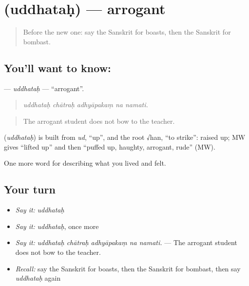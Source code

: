 \section[\texorpdfstring{\sk{उद्धतः} (uddhataḥ)}{उद्धतः (uddhataḥ)}]{ (uddhataḥ) — arrogant}

\label{lesson:SA-C458-uddhatah}



\begin{quote}
Before the new one: say the Sanskrit for boasts, then the Sanskrit for bombast.
\end{quote}

\subsection*{You'll want to know: }
\textbf{} — \emph{uddhataḥ} — \textquotedblleft{}arrogant\textquotedblright{}.

\begin{quote}
    
\end{quote}

\begin{quote}
\emph{uddhataḥ chātraḥ adhyāpakaṃ na namati.}
\end{quote}

\begin{quote}
The arrogant student does not bow to the teacher.
\end{quote}

\begin{cousinweb}
\textbf{} (\emph{uddhataḥ}) is built from \emph{ud}, \textquotedblleft{}up\textquotedblright{}, and the root √han, \textquotedblleft{}to strike\textquotedblright{}: raised up; MW gives \textquotedblleft{}lifted up\textquotedblright{} and then \textquotedblleft{}puffed up, haughty, arrogant, rude\textquotedblright{} (MW).
\end{cousinweb}

\begin{grammarlens}[title={What you've built}]
One more word for describing what you lived and felt.
\end{grammarlens}

\subsection*{Your turn}
\begin{itemize}
\raggedright
  \item \emph{Say it:} \emph{uddhataḥ}
  \item \emph{Say it:} \emph{uddhataḥ}, once more
  \item \emph{Say it:} \emph{uddhataḥ chātraḥ adhyāpakaṃ na namati.} — The arrogant student does not bow to the teacher.
  \item \emph{Recall:} say the Sanskrit for boasts, then the Sanskrit for bombast, then say \emph{uddhataḥ} again
\end{itemize}

